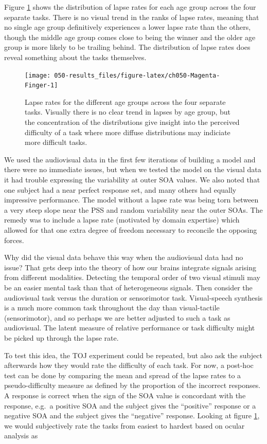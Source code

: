 \documentclass[11pt, oneside, openany]{scrbook}
\begin{document}
Figure \ref{fig:ch050-Magenta-Finger} shows the distribution of lapse rates for each age group across the four separate tasks. There is no visual trend in the ranks of lapse rates, meaning that no single age group definitively experiences a lower lapse rate than the others, though the middle age group comes close to being the winner and the older age group is more likely to be trailing behind. The distribution of lapse rates does reveal something about the tasks themselves.

\begin{figure}

{\centering \texttt{[image: 050-results\_files/figure-latex/ch050-Magenta-Finger-1]} 

}

\caption{Lapse rates for the different age groups across the four separate tasks. Visually there is no clear trend in lapses by age group, but the concentration of the distributions give insight into the perceived difficulty of a task where more diffuse distributions may indiciate more difficult tasks.}\label{fig:ch050-Magenta-Finger}
\end{figure}

We used the audiovisual data in the first few iterations of building a model and there were no immediate issues, but when we tested the model on the visual data it had trouble expressing the variability at outer SOA values. We also noted that one subject had a near perfect response set, and many others had equally impressive performance. The model without a lapse rate was being torn between a very steep slope near the PSS and random variability near the outer SOAs. The remedy was to include a lapse rate (motivated by domain expertise) which allowed for that one extra degree of freedom necessary to reconcile the opposing forces.

Why did the visual data behave this way when the audiovisual data had no issue? That gets deep into the theory of how our brains integrate signals arising from different modalities. Detecting the temporal order of two visual stimuli may be an easier mental task than that of heterogeneous signals. Then consider the audiovisual task versus the duration or sensorimotor task. Visual-speech synthesis is a much more common task throughout the day than visual-tactile (sensorimotor), and so perhaps we are better adjusted to such a task as audiovisual. The latent measure of relative performance or task difficulty might be picked up through the lapse rate.

To test this idea, the TOJ experiment could be repeated, but also ask the subject afterwards how they would rate the difficulty of each task. For now, a post-hoc test can be done by comparing the mean and spread of the lapse rates to a pseudo-difficulty measure as defined by the proportion of the incorrect responses. A response is correct when the sign of the SOA value is concordant with the response, e.g.~a positive SOA and the subject gives the ``positive'' response or a negative SOA and the subject gives the ``negative'' response. Looking at figure \ref{fig:ch050-Magenta-Finger}, we would subjectively rate the tasks from easiest to hardest based on ocular analysis as
\end{document}
